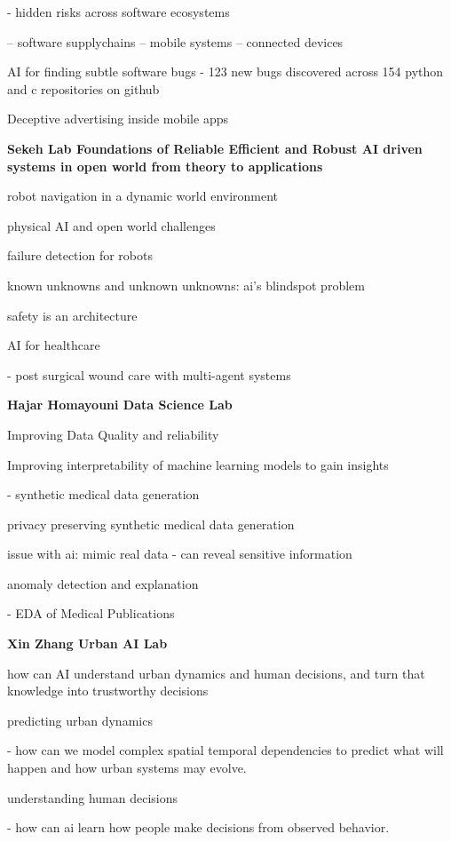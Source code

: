\documentclass{article}
\begin{document}
- hidden risks across software ecosystems

-- software supplychains
-- mobile systems
-- connected devices

AI for finding subtle software bugs
 - 123 new bugs discovered across 154 python and c repositories on github

 Deceptive advertising inside mobile apps


 \textbf{\Large Sekeh Lab Foundations of Reliable Efficient and Robust AI driven systems in open world from theory to applications}

robot navigation in a dynamic world environment

physical AI and open world challenges

failure detection for robots

known unknowns and unknown unknowns: ai's blindspot problem

safety is an architecture

AI for healthcare

- post surgical wound care with multi-agent systems


\textbf{\Large Hajar Homayouni Data Science Lab}

Improving Data Quality and reliability

Improving interpretability of machine learning models to gain insights

- synthetic medical data generation

privacy preserving synthetic medical data generation

issue with ai: mimic real data - can reveal sensitive information

anomaly detection and explanation

- EDA of Medical Publications

\textbf{\Large Xin Zhang Urban AI Lab}

how can AI understand urban dynamics and human decisions, and turn that knowledge into trustworthy decisions

predicting urban dynamics

- how can we model complex spatial temporal dependencies to predict what will happen and how urban systems may evolve.

understanding human decisions

- how can ai learn how people make decisions from observed behavior.
\end{document}
